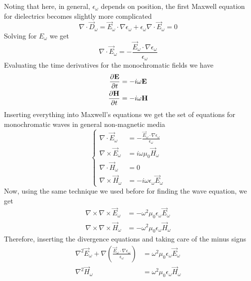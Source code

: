 \documentclass[../electromagnetism.tex]{subfiles}
\begin{document}
Noting that here, in general, $\epsilon_\omega$ depends on position, the first Maxwell equation for dielectrics becomes slightly more complicated
\begin{equation*}
	\nabla\cdot\vec{D}_\omega=\vec{E}_\omega\cdot\nabla\epsilon_\omega+\epsilon_\omega\nabla\cdot\vec{E}_\omega=0
\end{equation*}
Solving for $E_\omega$ we get
\begin{equation}
	\nabla\cdot\vec{E}_\omega=-\frac{\vec{E}_\omega\cdot\nabla\epsilon_\omega}{\epsilon_\omega}
	\label{eq:gaussdie.waves}
\end{equation}
Evaluating the time derivatives for the monochromatic fields we have
\begin{equation*}
	\begin{aligned}
		\pdv{\mathbf{E}}{t}&= -i\omega\mathbf{E}\\
		\pdv{\mathbf{H}}{t}&= -i\omega\mathbf{H}
	\end{aligned}
\end{equation*}
Inserting everything into Maxwell's equations we get the set of equations for monochromatic waves in general non-magnetic media
\begin{equation}
	\left\{\begin{aligned}
			\nabla\cdot\vec{E}_\omega&= -\frac{\vec{E}_\omega\cdot\nabla\epsilon_\omega}{\epsilon_\omega}\\
			\nabla\times\vec{E}_\omega&= i\omega\mu_0\vec{H}_\omega\\
			\nabla\cdot\vec{H}_\omega&= 0\\
			\nabla\times\vec{H}_\omega&= -i\omega\epsilon_\omega\vec{E}_\omega
	\end{aligned}\right.
	\label{eq:mweqdie.waves}
\end{equation}
Now, using the same technique we used before for finding the wave equation, we get
\begin{equation*}
	\begin{aligned}
		\nabla\times\nabla\times\vec{E}_\omega&= -\omega^2\mu_0\epsilon_\omega\vec{E}_\omega\\
		\nabla\times\nabla\times\vec{H}_\omega&= -\omega^2\mu_0\epsilon_\omega\vec{H}_\omega
	\end{aligned}
\end{equation*}
Therefore, inserting the divergence equations and taking care of the minus signs
\begin{equation*}
	\begin{aligned}
		\nabla^2\vec{E}_\omega+\nabla\left( \frac{\vec{E}_\omega\cdot\nabla\epsilon_\omega}{\epsilon_\omega} \right)&= \omega^2\mu_0\epsilon_\omega\vec{E}_\omega\\
		\nabla^2\vec{H}_\omega&= \omega^2\mu_0\epsilon_\omega\vec{H}_\omega
	\end{aligned}
\end{equation*}
\end{document}

